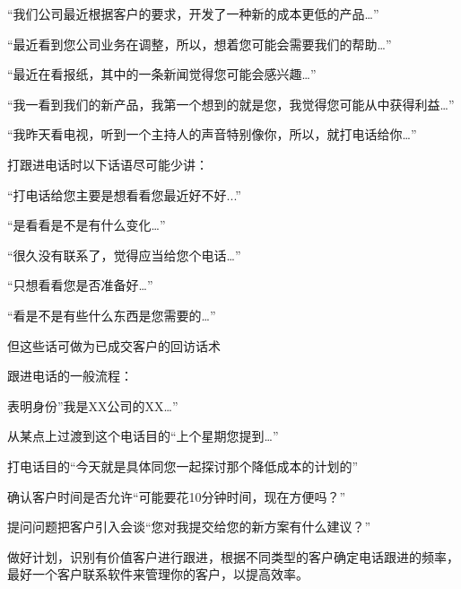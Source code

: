     “我们公司最近根据客户的要求，开发了一种新的成本更低的产品…”

    “最近看到您公司业务在调整，所以，想着您可能会需要我们的帮助…”

    “最近在看报纸，其中的一条新闻觉得您可能会感兴趣…”

    “我一看到我们的新产品，我第一个想到的就是您，我觉得您可能从中获得利益…”

    “我昨天看电视，听到一个主持人的声音特别像你，所以，就打电话给你…”

    打跟进电话时以下话语尽可能少讲：

    “打电话给您主要是想看看您最近好不好...”

    “是看看是不是有什么变化…”

    “很久没有联系了，觉得应当给您个电话…”

    “只想看看您是否准备好…”

    “看是不是有些什么东西是您需要的…”

    但这些话可做为已成交客户的回访话术

    跟进电话的一般流程：

    表明身份”我是XX公司的XX…”

    从某点上过渡到这个电话目的“上个星期您提到…”

    打电话目的“今天就是具体同您一起探讨那个降低成本的计划的”

    确认客户时间是否允许“可能要花10分钟时间，现在方便吗？”

    提问问题把客户引入会谈“您对我提交给您的新方案有什么建议？”

    做好计划，识别有价值客户进行跟进，根据不同类型的客户确定电话跟进的频率，最好一个客户联系软件来管理你的客户，以提高效率。
